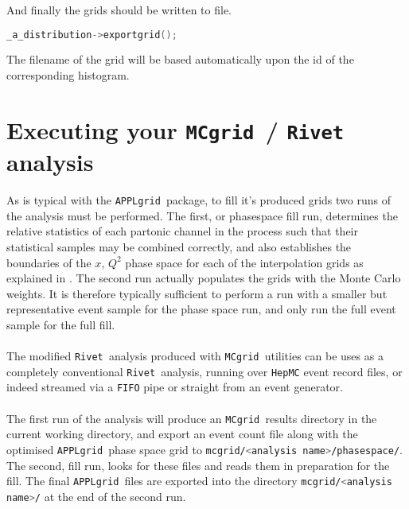 \documentclass[11pt]{article}
\newcommand{\mcgrid} {{\tt MCgrid }}
\newcommand{\rivet} {{\tt Rivet }}
\newcommand{\appl} {{\tt APPLgrid }}
\begin{document}
And finally the grids should be written to file.   
\begin{lstlisting}[language=c++]
	_a_distribution->exportgrid();	
\end{lstlisting}
The filename of the grid will be based automatically upon the id of the corresponding histogram.

\section{Executing your \mcgrid / \rivet analysis}
As is typical with the \appl package, to fill it's produced grids two runs of the analysis must be performed. The first, or phasespace fill run, determines the relative statistics of each partonic channel in the process such that their statistical samples may be combined correctly, and also establishes the boundaries of the $x$, $Q^2$ phase space for each of the interpolation grids as explained in \cite{Carli:2010rw}. The second run actually populates the grids with the Monte Carlo weights. It is therefore typically sufficient to perform a run with a smaller but representative event sample for the phase space run, and only run the full event sample for the full fill.
\\\\
The modified \rivet analysis produced with \mcgrid utilities can be uses as a completely conventional \rivet analysis, running over {\tt HepMC} event record files, or indeed streamed via a {\tt FIFO} pipe or straight from an event generator. \\\\
The first run of the analysis will produce an \mcgrid results directory in the current working directory, and export an event count file along with the optimised \appl phase space grid to \lstinline[language=bash]{mcgrid/<analysis name>/phasespace/}. The second, fill run, looks for these files and reads them in preparation for the fill. The final \appl files are exported into the directory \lstinline[language=bash]{mcgrid/<analysis name>/} at the end of the second run.
\end{document}
